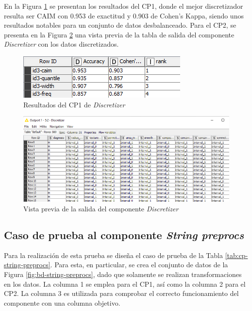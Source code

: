 En la Figura \ref{fig:comparacion-disc} se presentan los resultados del CP1, donde el mejor discretizador resulta ser CAIM con 0.953 de exactitud y 0.903 de Cohen's Kappa, siendo unos resultados notables para un conjunto de datos desbalanceado. Para el CP2, se presenta en la Figura \ref{fig:salida-discret} una vista previa de la tabla de salida del componente \textit{Discretizer} con los datos discretizados.

\begin{figure}[H]
	\centering
	\includegraphics[width=0.5\linewidth]{"figuras/capi 3/pruebas-jenn/comparacion-disc"}
	\caption{Resultados del CP1 de \textit{Discretizer}}
	\label{fig:comparacion-disc}
\end{figure}

\begin{figure}[H]
	\centering
	\includegraphics[width=0.8\linewidth]{"figuras/capi 3/pruebas-jenn/salida-discret"}
	\caption{Vista previa de la salida del componente \textit{Discretizer}}
	\label{fig:salida-discret}
\end{figure}



\subsection{Caso de prueba al componente \textit{String preprocs}}

Para la realización de esta prueba se diseña el caso de prueba de la Tabla \ref{tab:cp-string-preprocs}. Para esta, en particular, se crea el conjunto de datos de la Figura \ref{fig:bd-string-preprocs}, dado que solamente se realizan transformaciones en los datos. La columna 1 se emplea para el CP1, así como la columna 2 para el CP2. La columna 3 es utilizada para comprobar el correcto funcionamiento del componente con una columna objetivo.

